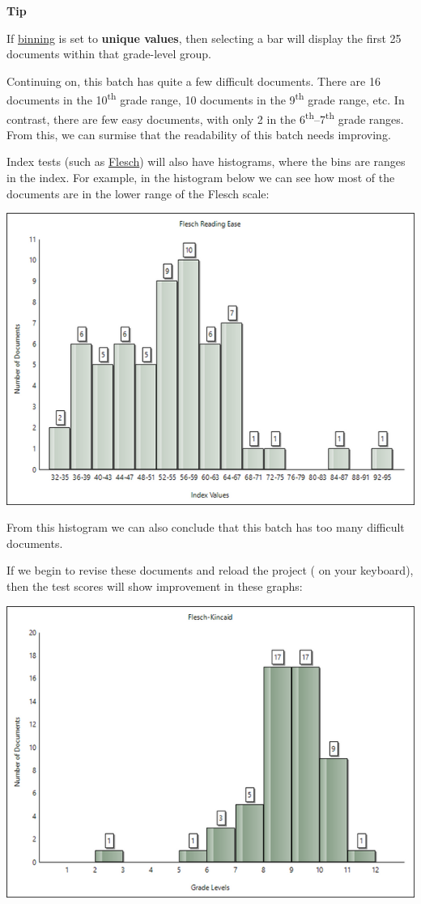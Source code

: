 \documentclass[
]{book}
\newenvironment{tipsection}
    {
    \begin{tcolorbox}[colframe=lightgray,colback=lightyellow,arc=3mm]
    \faLightbulb[regular] \textbf{Tip} \newline
    }
    {
    \end{tcolorbox}
    }
\theoremstyle{definition}
\theoremstyle{definition}
\theoremstyle{definition}
\theoremstyle{definition}
\theoremstyle{remark}
\begin{document}
\begin{tipsection}
If \protect\hyperlink{options-histograms}{binning} is set to \textbf{unique values}, then selecting a bar will display the first 25 documents within that grade-level group.

\end{tipsection}

Continuing on, this batch has quite a few difficult documents. There are 16 documents in the 10\textsuperscript{th} grade range, 10 documents in the 9\textsuperscript{th} grade range, etc. In contrast, there are few easy documents, with only 2 in the 6\textsuperscript{th}--7\textsuperscript{th} grade ranges. From this, we can surmise that the readability of this batch needs improving.

Index tests (such as \protect\hyperlink{flesch-test}{Flesch}) will also have histograms, where the bins are ranges in the index. For example, in the histogram below we can see how most of the documents are in the lower range of the Flesch scale:

\includegraphics{Images/histoindex.png}

From this histogram we can also conclude that this batch has too many difficult documents.

If we begin to revise these documents and reload the project ( on your keyboard), then the test scores will show improvement in these graphs:

\includegraphics{Images/histoimproved.png}
\end{document}

